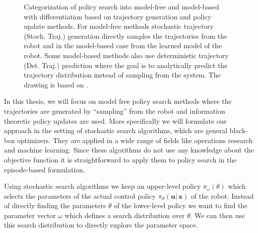 $~$
\begin{figure}[ht!]
  \centering
  
    \caption{\small
      Categorization of policy search into model-free
      and model-based with differentiation
      based on trajectory generation and policy update methods.
      For model-free methods stochastic trajectory (Stoch. Traj.) generation
      directly samples the trajectories from the robot
      and in the model-based case from the learned model of the robot.
      Some model-based methods also use deterministic trajectory
      (Det. Traj.) prediction where the goal is to 
      analytically predict the trajectory distribution
      instead of sampling from the system. 
      The drawing is based on
      \citet{deisenroth2013survey}.
    }
    \label{fig:policy}
\end{figure}



In this thesis, we will focus on model free policy search methods
where the trajectories are generated by ``sampling'' from
the robot and information theoretic policy updates are used.
More specifically we will formulate our approach
in the setting of stochastic
search algorithms, which are general black-box optimizers.
They are applied in a wide range of fields like operations research and
machine learning.
Since these algorithms do not use any knowledge about the
objective function it is straightforward to
apply them to policy search in the episode-based formulation.

Using stochastic search algorithms we keep an upper-level policy
$\pi_{\omega}(\theta)$ which selects the parameters of the
actual control policy $\pi_{\theta}(\mathbf{u} |\, \mathbf{x})$ of the robot.
Instead of directly finding the parameters $\theta$ of the
lower-level policy we want to find the parameter vector $\omega$ which
defines a search distribution over $\theta$. We can then use this
search distribution to directly explore the parameter space.


